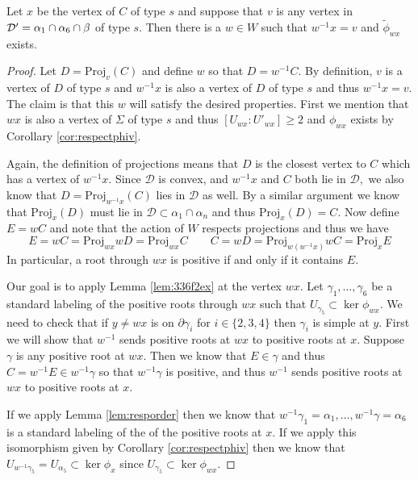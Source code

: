 \documentclass[class=book, crop=false]{standalone}
\begin{document}
\begin{lemma} 
	\label{lem:336f2Dex}
 Let $x$ be the vertex of $C$ of type $s$ and suppose that $v$ is any vertex in $\mathcal{D}'=\alpha_1\cap \alpha_6\cap \beta$ of type $s.$ Then there is a $w\in W$ such that $w^{-1}x=v$ and $\tilde{\phi}_{wx}$ exists.
\end{lemma}
\begin{proof}
	Let $D=\mathrm{Proj}_{v}(C)$ and define $w$ so that $D=w^{-1}C.$ By definition, $v$ is a vertex of $D$ of type $s$ and $w^{-1}x$ is also a vertex of $D$ of type $s$ and thus $w^{-1}x=v.$ The claim is that this $w$ will satisfy the desired properties. First we mention that $wx$ is also a vertex of $\Sigma$ of type $s$ and thus $[U_{wx}:U'_{wx}]\ge 2$ and $\phi_{wx}$ exists by Corollary \ref{cor:respectphiv}. 
	
	Again, the definition of projections means that $D$ is the closest vertex to $C$ which has a vertex of $w^{-1}x.$ Since $\mathcal{D}$ is convex, and $w^{-1}x$ and $C$ both lie in $\mathcal{D},$ we also know that $D=\mathrm{Proj}_{w^{-1}x}(C)$ lies in $\mathcal{D}$ as well. By a similar argument we know that $\mathrm{Proj}_{x}(D)$ must lie in $\mathcal{D}\subset \alpha_1\cap \alpha_n$ and thus $\mathrm{Proj}_{x}(D)=C.$ Now define $E=wC$ and note that the action of $W$ respects projections and thus we have
	\[
		E=wC=\mathrm{Proj}_{wx}{wD}=\mathrm{Proj}_{wx}{C} \qquad C=wD=\mathrm{Proj}_{w(w^{-1}x)}{wC}=\mathrm{Proj}_{x}{E}
	\]
In particular, a root through $wx$ is positive if and only if it contains $E.$

Our goal is to apply Lemma \ref{lem:336f2ex} at the vertex $wx.$ Let $\gamma_1,\dots,\gamma_6$ be a standard labeling of the positive roots through $wx$ such that $U_{\gamma_5}\subset \ker \phi_{wx}.$ We need to check that if $y\neq wx$ is on $\partial\gamma_i$ for $i\in \{2,3,4\}$ then $\gamma_i$ is simple at $y.$ First we will show that $w^{-1}$ sends positive roots at $wx$ to positive roots at $x.$ Suppose $\gamma$ is any positive root at $wx.$ Then we know that $E\in \gamma$ and thus $C=w^{-1}E\in w^{-1}\gamma$ so that $w^{-1}\gamma$ is positive, and thus $w^{-1}$ sends positive roots at $wx$ to positive roots at $x.$

If we apply Lemma \ref{lem:resporder} then we know that $w^{-1}\gamma_1=\alpha_1,\dots,w^{-1}\gamma=\alpha_6$ is a standard labeling of the of the positive roots at $x.$ If we apply this isomorphism given by Corollary \ref{cor:respectphiv} then we know that $U_{w^{-1}\gamma_5}=U_{\alpha_5}\subset \ker \phi_x$ since $U_{\gamma_5}\subset \ker \phi_{wx}.$ 


\end{proof}
\end{document}
